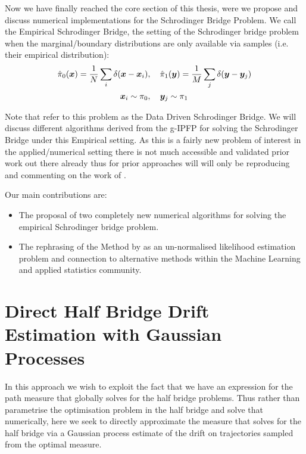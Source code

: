 \documentclass[a4paper,12pt,twoside,openright]{report}
\theoremstyle{definition}
\begin{document}
Now we have finally reached the core section of this thesis, were we propose and discuss numerical implementations for the Schrodinger Bridge Problem. We call the Empirical Schrodinger Bridge, the setting of the Schrodinger bridge problem when the marginal/boundary distributions are only available via samples (i.e. their empirical distribution):
\begin{align}
    \hat{\pi}_0({\bm{x}})  = \frac{1}{N}\sum_i \delta({\bm{x}} -{\bm{x}}_i) &, \quad\hat{\pi}_1({\bm{y}})  = \frac{1}{M}\sum_j \delta({\bm{y}} -{\bm{y}}_j) \nonumber\\
    {\bm{x}}_i \sim \pi_0 &, \quad {\bm{y}}_j \sim \pi_1
\end{align}

Note that \cite{pavon2018data} refer to this problem as the Data Driven Schrodinger Bridge. We will discuss  different algorithms derived from the g-IPFP for solving the Schrodinger Bridge under this Empirical setting. As this is a fairly new problem of interest in the applied/numerical setting there is not much accessible and validated prior work out there already thus for prior approaches will will only be reproducing and commenting on the work of \cite{pavon2018data}.

Our main contributions are:

\begin{itemize}
    \item The proposal of two completely new numerical algorithms for solving the empirical Schrodinger bridge problem.
    \item The rephrasing of the Method by \cite{pavon2018data} as an un-normalised likelihood estimation problem and connection to alternative methods within the Machine Learning and applied statistics community.
\end{itemize}

\section{Direct Half Bridge Drift Estimation with Gaussian Processes}

In this approach we wish to exploit the fact that we have an expression for the path measure that globally solves for the half bridge problems.  Thus rather than parametrise the optimisation problem in the half bridge and solve that numerically, here we seek to directly approximate the measure that solves for the half bridge via a Gaussian process estimate of the drift on trajectories sampled from the optimal measure.
\end{document}
